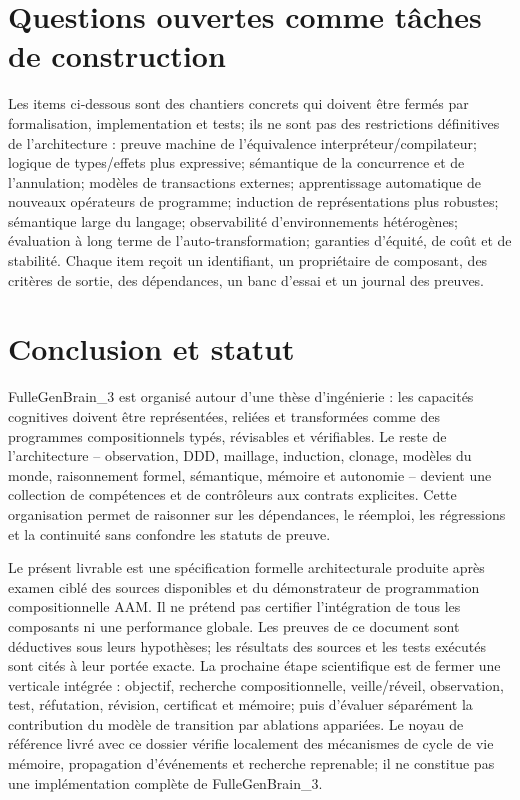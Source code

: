 \documentclass[11pt,a4paper]{article}
\begin{document}
\section{Questions ouvertes comme tâches de construction}
Les items ci-dessous sont des chantiers concrets qui doivent être fermés par formalisation, implementation et tests; ils ne sont pas des restrictions définitives de l'architecture : preuve machine de l'équivalence interpréteur/compilateur; logique de types/effets plus expressive; sémantique de la concurrence et de l'annulation; modèles de transactions externes; apprentissage automatique de nouveaux opérateurs de programme; induction de représentations plus robustes; sémantique large du langage; observabilité d'environnements hétérogènes; évaluation à long terme de l'auto-transformation; garanties d'équité, de coût et de stabilité. Chaque item reçoit un identifiant, un propriétaire de composant, des critères de sortie, des dépendances, un banc d'essai et un journal des preuves.

\section{Conclusion et statut}
FulleGenBrain\_3 est organisé autour d'une thèse d'ingénierie : les capacités cognitives doivent être représentées, reliées et transformées comme des programmes compositionnels typés, révisables et vérifiables. Le reste de l'architecture -- observation, DDD, maillage, induction, clonage, modèles du monde, raisonnement formel, sémantique, mémoire et autonomie -- devient une collection de compétences et de contrôleurs aux contrats explicites. Cette organisation permet de raisonner sur les dépendances, le réemploi, les régressions et la continuité sans confondre les statuts de preuve.

Le présent livrable est une spécification formelle architecturale produite après examen ciblé des sources disponibles et du démonstrateur de programmation compositionnelle AAM. Il ne prétend pas certifier l'intégration de tous les composants ni une performance globale. Les preuves de ce document sont déductives sous leurs hypothèses; les résultats des sources et les tests exécutés sont cités à leur portée exacte. La prochaine étape scientifique est de fermer une verticale intégrée : objectif, recherche compositionnelle, veille/réveil, observation, test, réfutation, révision, certificat et mémoire; puis d'évaluer séparément la contribution du modèle de transition par ablations appariées. Le noyau de référence livré avec ce dossier vérifie localement des mécanismes de cycle de vie mémoire, propagation d'événements et recherche reprenable; il ne constitue pas une implémentation complète de FulleGenBrain\_3.
\end{document}
